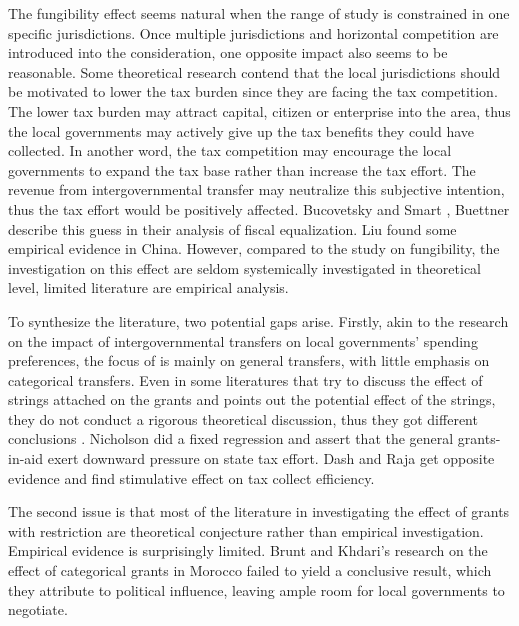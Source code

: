 The fungibility effect seems natural when the range of study is constrained in one specific jurisdictions. Once multiple jurisdictions and horizontal competition are introduced into the consideration, one opposite impact also seems to be reasonable. Some theoretical research contend that the local jurisdictions should be motivated to lower the tax burden since they are facing the tax competition. The lower tax burden may attract capital, citizen or enterprise into the area, thus the local governments may actively give up the tax benefits they could have collected. In another word, the tax competition may encourage the local governments to expand the tax base rather than increase the tax effort. The revenue from intergovernmental transfer may neutralize this subjective intention, thus the tax effort would be positively affected. Bucovetsky and Smart \cite{2010The}, Buettner \cite{2006The} describe this guess in their analysis of fiscal equalization. Liu \cite{2011Intergovernmental}
found some empirical evidence in China. However, compared to the study on fungibility, the investigation on this effect are seldom systemically investigated in theoretical level, limited literature are empirical analysis.

To synthesize the literature, two potential gaps arise. Firstly, akin to the research on the impact of intergovernmental transfers on local governments' spending preferences, the focus of  is mainly on general transfers, with little emphasis on categorical transfers. Even in some literatures that try to discuss the effect of strings attached on the grants and points out the potential effect of the strings, they do not conduct a rigorous theoretical discussion, thus they got different conclusions \cite{gramlich1997intergovernmental,chubb1985political,nicholson2004goal}. Nicholson \cite{nicholson2008fiscal} did a fixed regression and assert that the general grants-in-aid exert downward pressure on state tax effort. Dash and Raja \cite{dash2013intergovernmental}get opposite evidence and find stimulative effect on tax collect efficiency.

The second issue is that most of the literature in investigating the effect of grants with restriction are theoretical conjecture rather than empirical investigation. Empirical evidence is surprisingly limited. Brunt and Khdari's \cite{2016The} research on the effect of categorical grants in Morocco failed to yield a conclusive result, which they attribute to political influence, leaving ample room for local governments to negotiate.

